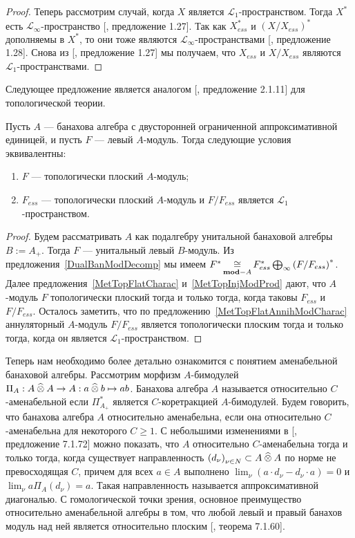 \begin{proof}
Теперь рассмотрим случай, когда $X$ является $\mathscr{L}_1$-пространством.
Тогда $X^*$ есть $\mathscr{L}_\infty$-пространство [\cite{BourgNewClOfLpSp},
предложение 1.27]. Так как $X_{ess}^*$ и ${(X/X_{ess})}^*$ дополняемы в $X^*$, то
они тоже являются $\mathscr{L}_\infty$-пространствами [\cite{BourgNewClOfLpSp},
предложение 1.28]. Снова из [\cite{BourgNewClOfLpSp}, предложение 1.27] мы
получаем, что $X_{ess}$ и $X/X_{ess}$ являются $\mathscr{L}_1$-пространствами.
\end{proof}

Следующее предложение является аналогом [\cite{RamsHomPropSemgroupAlg},
предложение 2.1.11] для топологической теории.

\begin{proposition}\label{TopFlatModCharac} Пусть $A$ --- банахова алгебра с
двусторонней ограниченной аппроксимативной единицей, и пусть $F$ --- левый
$A$-модуль. Тогда следующие условия эквивалентны:
\begin{enumerate}[label = (\roman*)]
    \item $F$ --- топологически плоский $A$-модуль;

    \item $F_{ess}$ --- топологически плоский $A$-модуль и $F/F_{ess}$ является
    $\mathscr{L}_1$-пространством.
\end{enumerate}
\end{proposition}
\begin{proof} Будем рассматривать $A$ как подалгебру унитальной банаховой
алгебры $B:=A_+$. Тогда $F$ --- унитальный левый $B$-модуль. Из
предложения~\ref{DualBanModDecomp} мы имеем
$F^*\mathop{\mathbin{\cong}}\limits_{\mathbf{mod}-A}F_{ess}^*\bigoplus_\infty {(F/F_{ess})}^*$. Далее
предложения~\ref{MetTopFlatCharac} и~\ref{MetTopInjModProd} дают, что $A$-модуль
$F$ топологически плоский тогда и только тогда, когда таковы $F_{ess}$ и
$F/F_{ess}$. Осталось заметить, что по
предложению~\ref{MetTopFlatAnnihModCharac} аннуляторный $A$-модуль $F/F_{ess}$
является топологически плоским тогда и только тогда, когда он является
$\mathscr{L}_1$-пространством.
\end{proof}

Теперь нам необходимо более детально ознакомится с понятием аменабельной
банаховой алгебры. Рассмотрим морфизм $A$-бимодулей $\Pi_A:A\mathbin{\widehat{\otimes}} A\to
A:a\mathbin{\widehat{\otimes}} b\mapsto ab$. Банахова алгебра $A$ называется относительно
$C$-аменабельной если $\Pi_{A_+}^*$ является $C$-коретракцией $A$-бимодулей.
Будем говорить, что банахова алгебра $A$ относительно аменабельна, если она
относительно $C$-аменабельна для некоторого $C\geq 1$.  С небольшими изменениями
в [\cite{HelBanLocConvAlg}, предложение 7.1.72] можно показать, что $A$
относительно $C$-аменабельна тогда и только тогда, когда существует
направленность ${(d_\nu)}_{\nu\in N}\subset A\mathbin{\widehat{\otimes}} A$ по норме не
превосходящая $C$, причем для всех $a\in A$ выполнено $\lim_\nu(a\cdot
d_\nu-d_\nu\cdot a)=0$ и $\lim_\nu a\Pi_A(d_\nu)=a$. Такая направленность
называется аппроксимативной диагональю. С гомологической точки зрения, основное
преимущество относительно аменабельной алгебры в том, что любой левый и правый
банахов модуль над ней является относительно плоским [\cite{HelBanLocConvAlg},
теорема 7.1.60].

